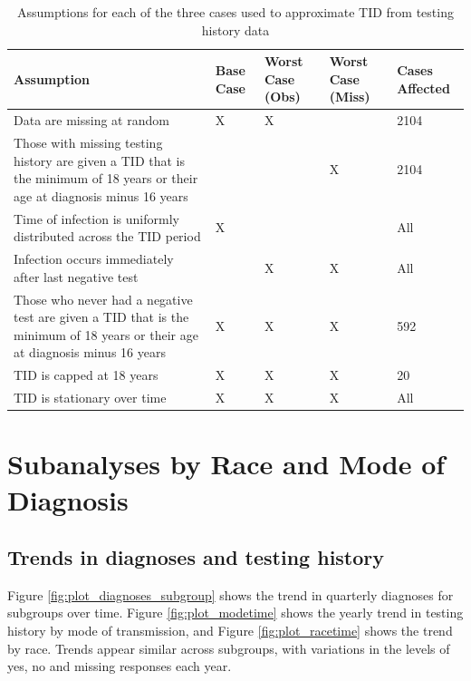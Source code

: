 \documentclass{article}\usepackage[]{graphicx}\usepackage[]{color}
\begin{document}
\begin{table}[!h]
\centering
\caption{Assumptions for each of the three cases used to approximate TID from testing history data}
\begin{tabular}{|p{7cm}|p{1.5cm}|p{1.5cm}|p{1.5cm}|p{1.5cm}|}
  \hline
Assumption & Base Case & Worst Case (Obs) & Worst Case (Miss) & Cases Affected \\ 
  \hline
Data are missing at random & X & X &  & 2104 \\
  \hline
Those with missing testing history are given a TID that is the minimum of 18 years or their age at diagnosis minus 16 years &  &  & X & 2104 \\
   \hline
Time of infection is uniformly distributed across the TID period  & X &  &   & All \\
  \hline
Infection occurs immediately after last negative test &  & X & X & All \\
  \hline
Those who never had a negative test are given a TID that is the minimum of 18 years or their age at diagnosis minus 16 years & X & X & X & 592 \\
  \hline
TID is capped at 18 years & X & X & X & 20 \\
  \hline
TID is stationary over time & X & X & X & All \\
  \hline
\end{tabular}
\label{tab:TID_case_assumptions}
\end{table}


\section{Subanalyses by Race and Mode of Diagnosis}
\subsection{Trends in diagnoses and testing history}
\label{sec:testingBySubgroup}

Figure \ref{fig:plot_diagnoses_subgroup} shows the trend in quarterly diagnoses for subgroups over time.  Figure \ref{fig:plot_modetime} shows the yearly trend in testing history by mode of transmission, and Figure \ref{fig:plot_racetime} shows the trend by race. Trends appear similar across subgroups, with variations in the levels of yes, no and missing responses each year.
\end{document}
